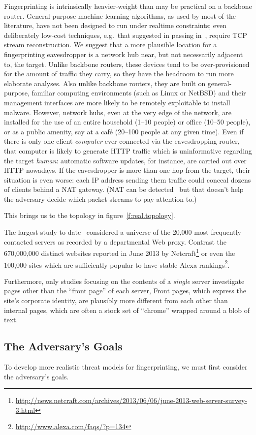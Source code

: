 Fingerprinting is intrinsically heavier-weight than may be practical
on a backbone router.  General-purpose machine learning algorithms, as
used by most of the literature, have not been designed to run under
realtime constraints; even deliberately low-cost techniques,
e.g.\ that suggested in passing in~\cite{weinberg2012stegotorus},
require TCP stream reconstruction.  We suggest that a more plausible
location for a fingerprinting eavesdropper is a network hub near, but
not necessarily adjacent to, the target.  Unlike backbone routers,
these devices tend to be over-provisioned for the amount of traffic
they carry, so they have the headroom to run more elaborate analyses.
Also unlike backbone routers, they are built on general-purpose,
familiar computing environments (such as Linux or NetBSD) and their
management interfaces are more likely to be remotely exploitable to
install malware.  However, network hubs, even at the
very edge of the network, are installed for the use of an entire
household (1--10 people) or office (10--50 people), or as a public
amenity, say at a café (20--100 people at any given time).  Even if
there is only one client \emph{computer} ever connected via the
eavesdropping router, that computer is likely to generate HTTP traffic
which is uninformative regarding the target \emph{human}: automatic
software updates, for instance, are carried out over HTTP nowadays.
If the eavesdropper is more than one hop from the target, their
situation is even worse: each IP address sending them traffic could
conceal dozens of clients behind a NAT gateway.  (NAT can be
detected~\cite{elie2005timestamp,krmivcek2009netflow} but that doesn't
help the adversary decide which packet streams to pay attention to.)

This brings us to the topology in figure~\ref{f:real.topology}.


The largest study to date~\cite{sun2002statistical} considered a
universe of the 20,000 most frequently contacted servers as recorded
by a departmental Web proxy.  Contrast the 670,000,000 distinct
websites reported in June 2013 by
Netcraft\footnote{\url{http://news.netcraft.com/archives/2013/06/06/june-2013-web-server-survey-3.html}}
or even the 100,000 sites which are sufficiently popular to have
stable Alexa
rankings\footnote{\url{http://www.alexa.com/faqs/?p=134}}.

Furthermore, only studies focusing on the contents of a \emph{single}
server investigate pages other than the “front page” of each server,
Front pages, which express the site's corporate identity, are
plausibly more different from each other than internal pages, which
are often a stock set of “chrome” wrapped around a blob of text.


\subsection{The Adversary's Goals}

To develop more realistic threat models for fingerprinting, we must
first consider the adversary's goals.  

